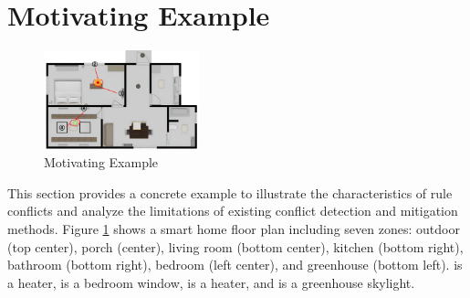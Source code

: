 \section{Motivating Example}

\begin{figure}[htbp]
	\centering
	\includegraphics[width=0.4\textwidth]{figure/motivated_example.png}
	\caption{Motivating Example}
	\label{motivated_example}
\end{figure}

This section provides a concrete example to illustrate the characteristics of rule conflicts and analyze the limitations of existing conflict detection and mitigation methods. Figure \ref{motivated_example} shows a smart home floor plan including seven zones: outdoor (top center), porch (center), living room (bottom center), kitchen (bottom right), bathroom (bottom right), bedroom (left center), and greenhouse (bottom left).  is a heater,  is a bedroom window,  is a heater, and  is a greenhouse skylight.

